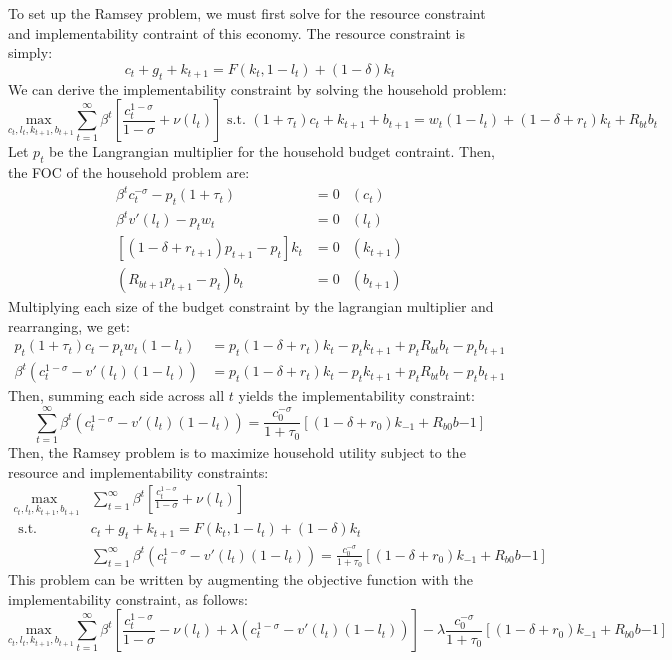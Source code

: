 \documentclass{article}
\newcommand{\usmax}[1]{\underset{#1}{\text{max }}}
\begin{document}
To set up the Ramsey problem, we must first solve for the resource constraint and implementability contraint of this economy. The resource constraint is simply:
\[
	c_t + g_t + k_{t+1} = F(k_t,1-l_t) +(1-\delta)k_t
\]
We can derive the implementability constraint by solving the household problem:
\[
	\usmax{c_t,l_t,k_{t+1},b_{t+1}}\sum_{t=1}^\infty \beta^t\left[\frac{c_t^{1-\sigma}}{1-\sigma}+\nu(l_t)\right]\text{ s.t. } 
		(1+\tau_t)c_t + k_{t+1} + b_{t+1} = w_t(1-l_t) +(1-\delta + r_t)k_t + R_{bt}b_t
\]
Let $p_t$ be the Langrangian multiplier for the household budget contraint. Then, the FOC of the household problem are:
\begin{align*}
	\beta^tc_t^{-\sigma} - p_t(1+\tau_t) 	&= 0	&(c_t)		\\
	\beta^tv'(l_t)-p_tw_t 					&= 0	&(l_t)		\\
	[(1-\delta+r_{t+1})p_{t+1} - p_t]k_t	&= 0	&(k_{t+1})	\\
	(R_{bt+1}p_{t+1}-p_t)b_t				&= 0	&(b_{t+1})	
\end{align*}
Multiplying each size of the budget constraint by the lagrangian multiplier and rearranging, we get:
\begin{align*}
	p_t(1+\tau_t)c_t - p_tw_t(1-l_t) 					&= p_t(1-\delta + r_t)k_t - p_tk_{t+1} + p_tR_{bt}b_t - p_tb_{t+1}	\\
	\beta^t\left(c_t^{1-\sigma}-v'(l_t)(1-l_t)\right) 	&= p_t(1-\delta + r_t)k_t - p_tk_{t+1} + p_tR_{bt}b_t - p_tb_{t+1}
\end{align*}
Then, summing each side across all $t$ yields the implementability constraint:
\[
	\sum_{t=1}^\infty\beta^t\left(c_t^{1-\sigma}-v'(l_t)(1-l_t)\right)  = \frac{c_0^{-\sigma}}{1+\tau_0}\left[(1-\delta + r_0)k_{-1} + R_{b0}b{-1}\right]
\]
Then, the Ramsey problem is to maximize household utility subject to the resource and implementability constraints:
\begin{align*}
	\usmax{c_t,l_t,k_{t+1},b_{t+1}}&\sum_{t=1}^\infty \beta^t\left[\frac{c_t^{1-\sigma}}{1-\sigma}+\nu(l_t)\right]	\\
		\text{ s.t. } 	&c_t + g_t + k_{t+1} = F(k_t,1-l_t) +(1-\delta)k_t	\\
						&\sum_{t=1}^\infty\beta^t\left(c_t^{1-\sigma}-v'(l_t)(1-l_t)\right)  = \frac{c_0^{-\sigma}}{1+\tau_0}\left[(1-\delta + r_0)k_{-1} + R_{b0}b{-1}\right]
\end{align*}
This problem can be written by augmenting the objective function with the implementability constraint, as follows:
{\footnotesize \[
	\usmax{c_t,l_t,k_{t+1},b_{t+1}}\sum_{t=1}^\infty \beta^t\left[\frac{c_t^{1-\sigma}}{1-\sigma}-\nu(l_t) + \lambda\left(c_t^{1-\sigma}-v'(l_t)(1-l_t)\right)\right] 
		- \lambda\frac{c_0^{-\sigma}}{1+\tau_0}\left[(1-\delta + r_0)k_{-1} + R_{b0}b{-1}\right]
\] }
\end{document}
